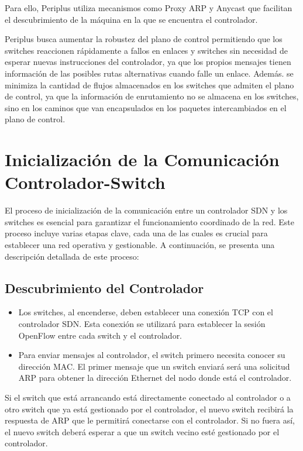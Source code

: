 \documentclass[a4paper, 12pt]{book}
\begin{document}
	Para ello, Periplus utiliza mecanismos como Proxy ARP y Anycast que facilitan el descubrimiento de la máquina en la que se encuentra el controlador.
	
	Periplus busca aumentar la robustez del plano de control permitiendo que los switches reaccionen rápidamente a fallos en enlaces y switches sin necesidad de esperar nuevas instrucciones del controlador, ya que los propios mensajes tienen información de las posibles rutas alternativas cuando falle un enlace.
	Además. se minimiza la cantidad de flujos almacenados en los switches que admiten el plano de control, ya que la información de enrutamiento no se almacena en los switches, sino en los caminos que van encapsulados en los paquetes intercambiados en el plano de control.
	
	
	\section{Inicialización de la Comunicación Controlador-Switch}
	
	El proceso de inicialización de la comunicación entre un controlador SDN y los switches es esencial para garantizar el funcionamiento coordinado de la red. Este proceso incluye varias etapas clave, cada una de las cuales es crucial para establecer una red operativa y gestionable. A continuación, se presenta una descripción detallada de este proceso:
	
	\subsection{Descubrimiento del Controlador}
	\begin{itemize}
		\item Los switches, al encenderse, deben establecer una conexión TCP con el controlador SDN. Esta conexión se utilizará para establecer la sesión OpenFlow entre cada switch y el controlador.
		\item Para enviar mensajes al controlador, el switch primero necesita conocer su dirección MAC. El primer mensaje que un switch enviará será una solicitud ARP para obtener la dirección Ethernet del nodo donde está el controlador.
	\end{itemize}
	Si el switch que está arrancando está directamente conectado al controlador o a otro
	switch que ya está gestionado por el controlador, el nuevo switch recibirá la respuesta
	de ARP que le permitirá conectarse 	con el controlador. Si no fuera así, el nuevo switch
	deberá esperar 	a que un  switch vecino	esté gestionado	por el	controlador.
	
\end{document}

